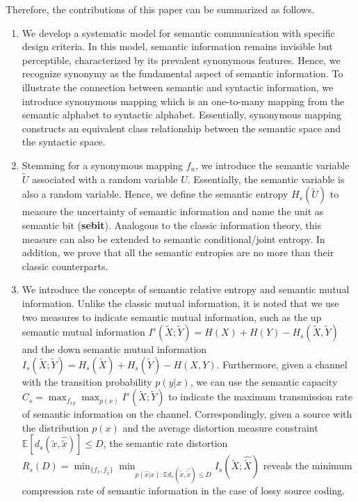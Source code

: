 \documentclass[12pt, draftclsnofoot,onecolumn]{IEEEtran}
\begin{document}
Therefore, the contributions of this paper can be summarized as follows.
\begin{enumerate}[(1)]
  \item We develop a systematic model for semantic communication with specific design criteria. In this model, semantic information remains invisible but perceptible, characterized by its prevalent synonymous features. Hence, we recognize synonymy as the fundamental aspect of semantic information. To illustrate the connection between semantic and syntactic information, we introduce synonymous mapping which is an one-to-many mapping from the semantic alphabet to syntactic alphabet. Essentially, synonymous mapping constructs an equivalent class relationship between the semantic space and the syntactic space.

  \item Stemming for a synonymous mapping $f_u$, we introduce the semantic variable $\tilde{U}$ associated with a random variable $U$. Essentially, the semantic variable is also a random variable. Hence, we define the semantic entropy $H_s(\tilde{U})$ to measure the uncertainty of semantic information and name the unit as semantic bit (\textbf{sebit}). Analogous to the classic information theory, this measure can also be extended to semantic conditional/joint entropy. In addition, we prove that all the semantic entropies are no more than their classic counterparts.

  \item We introduce the concepts of semantic relative entropy and semantic mutual information. Unlike the classic mutual information, it is noted that we use two measures to indicate semantic mutual information, such as the up semantic mutual information $I^s(\tilde{X};\tilde{Y})=H(X)+H(Y)-H_s(\tilde{X},\tilde{Y})$ and the down semantic mutual information $I_s(\tilde{X};\tilde{Y})=H_s(\tilde{X})+H_s(\tilde{Y})-H(X,Y)$. Furthermore, given a channel with the transition probability $p(y|x)$, we can use the semantic capacity $C_s=\max_{f_{xy}}\max_{p(x)}I^s(\tilde{X};\tilde{Y})$ to indicate the maximum transmission rate of semantic information on the channel. Correspondingly, given a source with the distribution $p(x)$ and the average distortion measure constraint $\mathbb{E}\left[d_s(\tilde{x},\hat{\tilde{x}})\right]\leq D$, the semantic rate distortion $R_s(D)=\min_{\{f_x,f_{\tilde{x}}\}}\min_{p(\hat{x}|x): \mathbb{E}d_s(\tilde{x},\hat{\tilde{x}})\leq D}I_s(\tilde{X};\hat{\tilde{X}})$ reveals the minimum compression rate of semantic information in the case of lossy source coding.


\end{enumerate}
\end{document}
